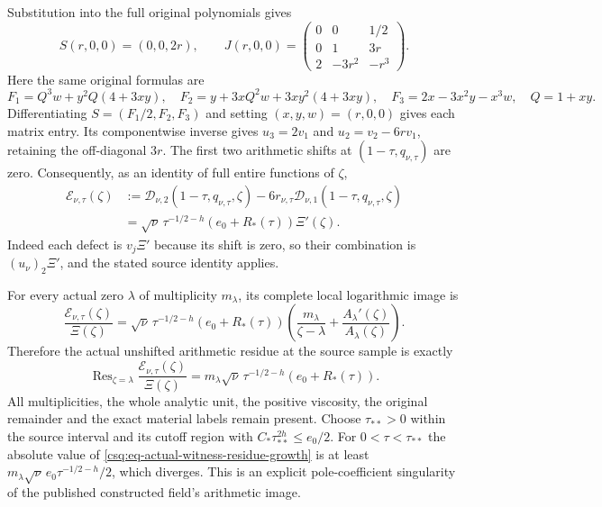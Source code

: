 Substitution into the full original polynomials gives
\[
 S(r,0,0)=(0,0,2r),\qquad
 J(r,0,0)=
 \begin{pmatrix}
 0&0&1/2\\
 0&1&3r\\
 2&-3r^2&-r^3
 \end{pmatrix}.
\]
Here the same original formulas are
\[
 F_1=Q^3w+y^2Q(4+3xy),\quad
 F_2=y+3xQ^2w+3xy^2(4+3xy),\quad
 F_3=2x-3x^2y-x^3w,\quad Q=1+xy.
\]
Differentiating $S=(F_1/2,F_2,F_3)$ and setting $(x,y,w)=(r,0,0)$
gives each matrix entry. Its componentwise inverse gives
$u_3=2v_1$ and $u_2=v_2-6rv_1$, retaining the off-diagonal $3r$.
The first two arithmetic shifts at $(1-\tau,q_{\nu,\tau})$ are zero.
Consequently, as an identity of full entire functions of $\zeta$,
\begin{equation}
\begin{split}
 \mathcal E_{\nu,\tau}(\zeta)
 &:=\mathcal D_{\nu,2}(1-\tau,q_{\nu,\tau},\zeta)
       -6r_{\nu,\tau}
          \mathcal D_{\nu,1}(1-\tau,q_{\nu,\tau},\zeta)\\
 &=\sqrt\nu\,\tau^{-1/2-h}
                    (e_0+R_*(\tau))\Xi'(\zeta).
\end{split}
 \label{csq:eq-actual-witness-entire-defect}
\end{equation}
Indeed each defect is $v_j\Xi'$ because its shift is zero, so their
combination is $(u_\nu)_2\Xi'$, and the stated source identity applies.

For every actual zero $\lambda$ of multiplicity $m_\lambda$, its
complete local logarithmic image is
\begin{equation}
 \frac{\mathcal E_{\nu,\tau}(\zeta)}{\Xi(\zeta)}
 =\sqrt\nu\,\tau^{-1/2-h}(e_0+R_*(\tau))
     \left(\frac{m_\lambda}{\zeta-\lambda}
                    +\frac{A_\lambda'(\zeta)}{A_\lambda(\zeta)}\right).
 \label{csq:eq-actual-witness-meromorphic-defect}
\end{equation}
Therefore the actual unshifted arithmetic residue at the source
sample is exactly
\begin{equation}
 \operatorname{Res}_{\zeta=\lambda}
       \frac{\mathcal E_{\nu,\tau}(\zeta)}{\Xi(\zeta)}
 =m_\lambda\sqrt\nu\,\tau^{-1/2-h}
                           (e_0+R_*(\tau)).
 \label{csq:eq-actual-witness-residue-growth}
\end{equation}
All multiplicities, the whole analytic unit, the positive viscosity,
the original remainder and the exact material labels remain present.
Choose $\tau_{**}>0$ within the source interval and its cutoff region
with $C_*\tau_{**}^{2h}\leq e_0/2$. For $0<\tau<\tau_{**}$ the
absolute value of \eqref{csq:eq-actual-witness-residue-growth} is at
least $m_\lambda\sqrt\nu\,e_0\tau^{-1/2-h}/2$, which diverges.
This is an explicit pole-coefficient singularity of the published
constructed field's arithmetic image.

